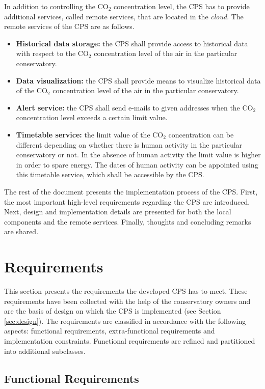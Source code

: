 \documentclass[a4paper, 11pt]{article}
\begin{document}
	In addition to controlling the CO$_2$ concentration level, the CPS has to provide additional services, called remote services, that are located in the \emph{cloud}. The remote services of the CPS are as follows. 
	\begin{itemize}
		\item \textbf{Historical data storage:} the CPS shall provide access to historical data with respect to the CO$_2$ concentration level of the air in the particular conservatory.
		\item \textbf{Data visualization:} the CPS shall provide means to visualize historical data of the CO$_2$ concentration level of the air in the particular conservatory.
		\item \textbf{Alert service:} the CPS shall send e-mails to given addresses when the CO$_2$ concentration level exceeds a certain limit value.
		\item \textbf{Timetable service:} the limit value of the CO$_2$ concentration can be different depending on whether there is human activity in the particular conservatory or not. In the absence of human activity the limit value is higher in order to spare energy. The dates of human activity can be appointed using this timetable service, which shall be accessible by the CPS.
	\end{itemize}
	
	The rest of the document presents the implementation process of the CPS. First, the most important high-level requirements regarding the CPS are introduced. Next, design and implementation details are presented for both the local components and the remote services. Finally, thoughts and concluding remarks are shared.	
	
	\section{Requirements}
	\label{sec:requirements}
	This section presents the requirements the developed CPS has to meet. These requirements have been collected with the help of the conservatory owners and are the basis of design on which the CPS is implemented (see Section \ref{sec:design}). The requirements are classified in accordance with the following aspects: functional requirements, extra-functional requirements and implementation constraints. Functional requirements are refined and partitioned into additional subclasses.
	
	\subsection{Functional Requirements}
	
\end{document}
